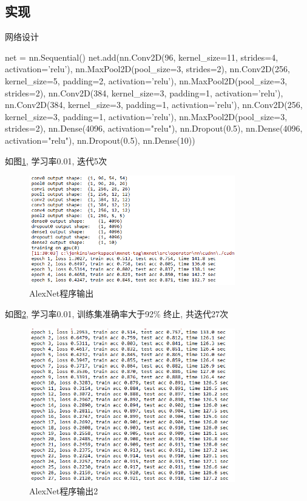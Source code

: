 \documentclass[a4paper]{article}
\begin{document}
\subsection{实现}

网络设计
\begin{python}
 
net = nn.Sequential()
net.add(nn.Conv2D(96,  kernel_size=11,  strides=4,  activation='relu'), 
        nn.MaxPool2D(pool_size=3,  strides=2), 
        nn.Conv2D(256,  kernel_size=5,  padding=2,  activation='relu'), 
        nn.MaxPool2D(pool_size=3,  strides=2), 
        nn.Conv2D(384,  kernel_size=3,  padding=1,  activation='relu'), 
        nn.Conv2D(384,  kernel_size=3,  padding=1,  activation='relu'), 
        nn.Conv2D(256,  kernel_size=3,  padding=1,  activation='relu'), 
        nn.MaxPool2D(pool_size=3,  strides=2), 
        nn.Dense(4096,  activation="relu"),  nn.Dropout(0.5), 
        nn.Dense(4096,  activation="relu"),  nn.Dropout(0.5), 
        nn.Dense(10))
\end{python}


如图\ref{AlexOutput1}, 学习率0.01, 迭代5次
\begin{figure}[!htb]
    \center
\includegraphics[width=0.8\textwidth]{alex_output.png}
\caption{AlexNet程序输出}
\label{AlexOutput1}

\end{figure}
 

如图\ref{AlexOutput2}, 学习率0.01, 训练集准确率大于92\% 终止, 共迭代27次
\begin{figure}[!ht]
    \center
\includegraphics[width=0.8\textwidth]{alex_output3.png}
\caption{AlexNet程序输出2}
\label{AlexOutput2}

\end{figure}
\end{document}
